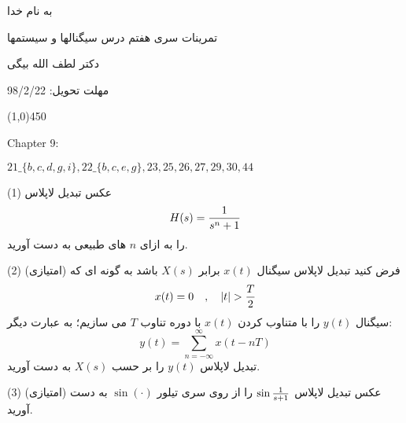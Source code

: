 \documentclass[50pt]{article}
\newcommand{\hl}{
\begin{center}
\line(1,0){450}
\end{center}}
\begin{document}
\setLTR 




\begin{RTL}
\Large{








\begin{center}
به نام خدا

تمرینات سری هفتم درس سیگنالها و سیستمها

دکتر لطف الله بیگی

مهلت تحویل: 98/2/22
\end{center}

\hl
\begin{latin}
Chapter 9:

$21\_\{b,c,d,g,i\} , 22\_\{b,c,e,g\} , 23 ,25, 26 ,27,29,30, 44 $
\end{latin}
(1) عکس تبدیل لاپلاس 
$$H(s)={1\over s^n+1}$$
را به ازای $n$ های طبیعی به دست آورید.

(2) (امتیازی) فرض کنید تبدیل لاپلاس سیگنال $x(t)$ برابر 
$X(s)$ 
باشد به گونه ای که 
$$x(t)=0\quad,\quad |t|>{T\over 2}$$
سیگنال $y(t)$ را با متناوب کردن $x(t)$ با دوره تناوب $T$ می سازیم؛ به عبارت دیگر:
$$
y(t)=\sum_{n=-\infty}^{\infty}x(t-nT)
$$
تبدیل لاپلاس $y(t)$ را بر حسب $X(s)$ به دست آورید.

(3) (امتیازی) عکس تبدیل لاپلاس 
$\sin {1\over s+1}$ 
را از روی سری تیلور $\sin(\cdot)$ به دست آورید.



}





\end{RTL}
\end{document}
